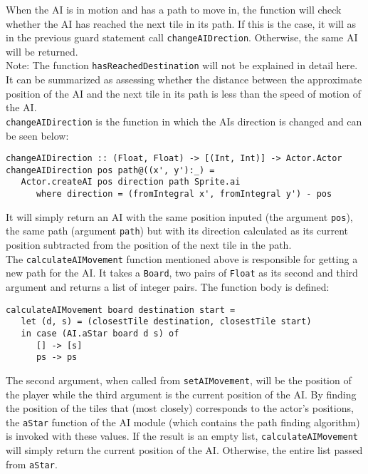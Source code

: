 \documentclass{article}
\begin{document}
        \newline
        When the AI is in motion and has a path to move in, the function will check whether the AI has reached the next tile in its path. If this is the case, it will as in the previous guard statement call \texttt{changeAIDrection}. Otherwise, the same AI will be returned. \\
        \newline Note: The function \texttt{hasReachedDestination} will not be explained in detail here. It can be summarized as assessing whether the distance between the approximate position of the AI and the next tile in its path is less than the speed of motion of the AI. \\
        \newline
        \texttt{changeAIDirection} is the function in which the AIs direction is changed and can be seen below:
\begin{verbatim}
changeAIDirection :: (Float, Float) -> [(Int, Int)] -> Actor.Actor
changeAIDirection pos path@((x', y'):_) =
   Actor.createAI pos direction path Sprite.ai
      where direction = (fromIntegral x', fromIntegral y') - pos
\end{verbatim}
		It will simply return an AI with the same position inputed (the argument \texttt{pos}), the same path (argument \texttt{path}) but with its direction calculated as its current position subtracted from the position of the next tile in the path. \\
        \newline
        The \texttt{calculateAIMovement} function mentioned above is responsible for getting a new path for the AI. It takes a \texttt{Board}, two pairs of \texttt{Float} as its second and third argument and returns a list of integer pairs. The function body is defined:
\begin{verbatim}
calculateAIMovement board destination start =
   let (d, s) = (closestTile destination, closestTile start)
   in case (AI.aStar board d s) of
      [] -> [s]
      ps -> ps
\end{verbatim}
		The second argument, when called from \texttt{setAIMovement}, will be the position of the player while the third argument is the current position of the AI. By finding the position of the tiles that (most closely) corresponds to the actor's positions, the \texttt{aStar} function of the AI module (which contains the path finding algorithm) is invoked with these values. If the result is an empty list, \texttt{calculateAIMovement} will simply return the current position of the AI. Otherwise, the entire list passed from \texttt{aStar}.
\end{document}
